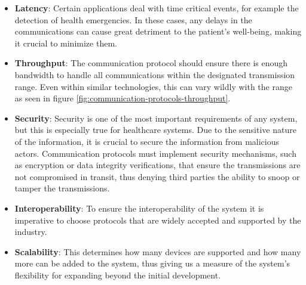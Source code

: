 \begin{itemize}
    \item \textbf{Latency}: Certain applications deal with time critical events, for example the detection of health emergencies. In these cases, any delays in the communications can cause great detriment to the patient's well-being, making it crucial to minimize them.
    \item \textbf{Throughput}: The communication protocol should ensure there is enough bandwidth to handle all communications within the designated transmission range. Even within similar technologies, this can vary wildly with the range as seen in figure \ref{fig:communication-protocols-throughput}. 
    \item \textbf{Security}: Security is one of the most important requirements of any system, but this is especially true for healthcare systems. Due to the sensitive nature of the information, it is crucial to secure the information from malicious actors. Communication protocols must implement security mechanisms, such as encryption or data integrity verifications, that ensure the transmissions are not compromised in transit, thus denying third parties the ability to snoop or tamper the transmissions.
    \item \textbf{Interoperability}: To ensure the interoperability of the system it is imperative to choose protocols that are widely accepted and supported by the industry. %
    \item \textbf{Scalability}: This determines how many devices are supported and how many more can be added to the system, thus giving us a measure of the system's flexibility for expanding beyond the initial development. 
\end{itemize}
 

